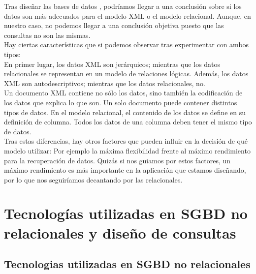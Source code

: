 \documentclass[12pt,a4paper]{article}
\begin{document}
Tras diseñar las bases de datos , podríamos llegar a una conclusión sobre si los datos son más adecuados para el modelo XML o el modelo relacional. Aunque, en nuestro caso, no podemos llegar a una conclusión objetiva puesto que las consultas no son las mismas.\\

Hay ciertas características que si podemos observar tras experimentar con ambos tipos:\\

En primer lugar, los datos XML son jerárquicos; mientras que los datos relacionales se representan en un modelo de relaciones lógicas. Además, los datos XML son autodescriptivos; mientras que los datos relacionales, no.\\

Un documento XML contiene no sólo los datos, sino también la codificación de los datos que explica lo que son. Un solo documento puede contener distintos tipos de datos. En el modelo relacional, el contenido de los datos se define en su definición de columna. Todos los datos de una columna deben tener el mismo tipo de datos.\\

Tras estas diferencias, hay otros factores que pueden influir en la decisión de qué modelo utilizar: Por ejemplo la máxima flexibilidad frente al máximo rendimiento para la recuperación de datos. Quizás si nos guiamos por estos factores, un máximo rendimiento es más importante en la aplicación que estamos diseñando, por lo que nos seguiríamos decantando por las relacionales.




\newpage

\section{Tecnologías utilizadas en SGBD no relacionales y diseño de consultas} \label{pto5} 

\subsection{Tecnologias utilizadas en SGBD no relacionales}  \label{pto51}
\end{document}
